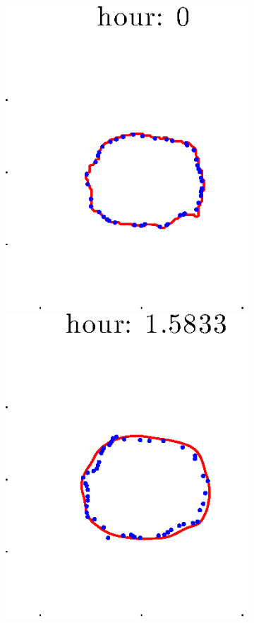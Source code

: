 \documentclass[12pt]{article}
\begin{document}
\begin{figure}[h!]
\begin{subfigure}[b]{.3\textwidth}
	\end{subfigure}
	\begin{subfigure}[b]{.3\textwidth}
	\centering
		\includegraphics[height=.15\textheight]{Pos10exp2/full/first1.eps}
		\includegraphics[height=.15\textheight]{Pos10exp2/full/first2.eps}

\end{subfigure}
\end{figure}
\end{document}
